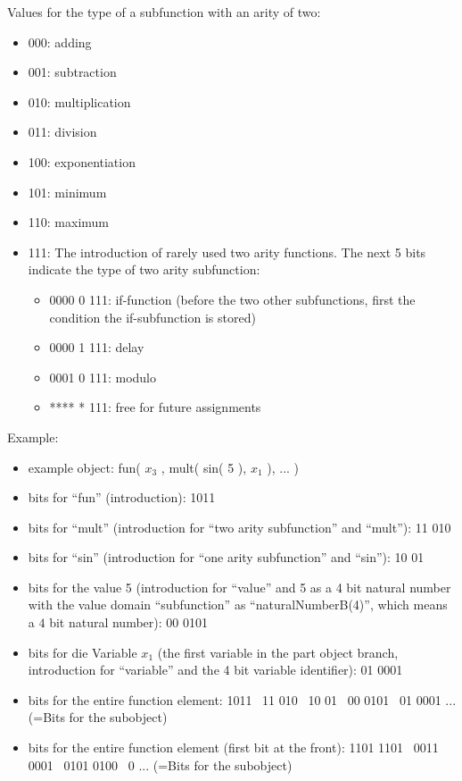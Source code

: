 \bigskip\noindent
Values for the type of a subfunction with an arity of two:
\begin{itemize}
 \item 000: adding
 \item 001: subtraction
 \item 010: multiplication
 \item 011: division
 \item 100: exponentiation
 \item 101: minimum
 \item 110: maximum
 \item 111: The introduction of rarely used two arity functions. The next 5 bits indicate the type of two arity subfunction:
 \begin{itemize}
 \item 0000 0 111: if-function (before the two other subfunctions, first the condition the if-subfunction is stored)
 \item 0000 1 111: delay
 \item 0001 0 111: modulo
 \item **** * 111: free for future assignments
 \end{itemize}
\end{itemize}

\bigskip\noindent
Example:
\begin{itemize}
 \item example object: fun( $x_3$ , mult( sin( 5 ), $x_1$ ), ... )
 \item bits for ``fun'' (introduction): 1011
 \item bits for ``mult'' (introduction for ``two arity subfunction'' and ``mult''): 11 010
 \item bits for ``sin'' (introduction for ``one arity subfunction'' and ``sin''): 10 01
 \item bits for the value 5 (introduction for ``value'' and 5 as a 4 bit natural number with the value domain ``subfunction'' as ``naturalNumberB(4)'', which means a $4$ bit natural number): 00 0101
 \item bits for die Variable $x_1$ (the first variable in the part object branch, introduction for ``variable'' and the 4 bit variable identifier): 01 0001
 \item bits for the entire function element: 1011 \ 11 010 \ 10 01 \ 00 0101 \ 01 0001 ...  (=Bits for the subobject)
 \item bits for the entire function element (first bit at the front): 1101 1101 \ 0011 0001 \ 0101 0100 \ 0 ...  (=Bits for the subobject)
\end{itemize}

